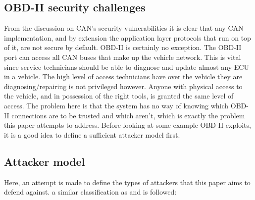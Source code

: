 \documentclass[11pt]{article}
\begin{document}
\subsection{OBD-II security challenges}
\label{sec:obd_challenges}

 From the discussion on CAN's security vulnerabilities it is clear that any CAN implementation, and by extension the application layer protocols that run on top of it, are not secure by default. OBD-II is certainly no exception. The OBD-II port can access all CAN buses that make up the vehicle network. This is vital since service technicians should be able to diagnose and update almost any ECU in a vehicle\cite{Kosher}. The high level of access technicians have over the vehicle they are diagnosing/repairing is not privileged however. Anyone with physical access to the vehicle, and in possession of the right tools, is granted the same level of access. The problem here is that the system has no way of knowing which OBD-II connections are to be trusted and which aren't, which is exactly the problem this paper attempts to address. Before looking at some example OBD-II exploits, it is a good idea to define a sufficient attacker model first.

\subsection{Attacker model} 
\label{sec:attacker_model}
Here, an attempt is made to define the types of attackers that this paper aims to defend against. a similar classification as \cite{Maxim} and \cite{Petit} is followed:
\end{document}
